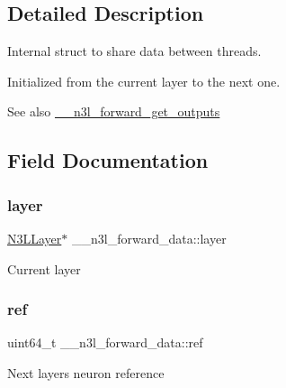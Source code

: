 \subsection{Detailed Description}
Internal struct to share data between threads. 

Initialized from the current layer to the next one.

\begin{DoxySeeAlso}{See also}
\hyperlink{n3__forward_8c_ac55d957c2a3b754387f5037e87317870}{\+\_\+\+\_\+n3l\+\_\+forward\+\_\+get\+\_\+outputs} 
\end{DoxySeeAlso}


\subsection{Field Documentation}
\mbox{\label{struct____n3l__forward__data_aaeb45910cc54c7f3a770dbd124477fc2}} 
\subsubsection{\texorpdfstring{layer}{layer}}
{\footnotesize\ttfamily \hyperlink{n3__header_8h_a9ee3a7104816bdb6222148cfe9ca8ad9}{N3\+L\+Layer}$\ast$ \+\_\+\+\_\+n3l\+\_\+forward\+\_\+data\+::layer}

Current layer \mbox{\label{struct____n3l__forward__data_ada78b9bd1418f8dccab76319afb7d64b}} 
\subsubsection{\texorpdfstring{ref}{ref}}
{\footnotesize\ttfamily uint64\+\_\+t \+\_\+\+\_\+n3l\+\_\+forward\+\_\+data\+::ref}

Next layer\textquotesingle{}s neuron reference \mbox{\label{struct____n3l__forward__data_ac870eae5ce14b297b5d78cc7112c8cec}} 
